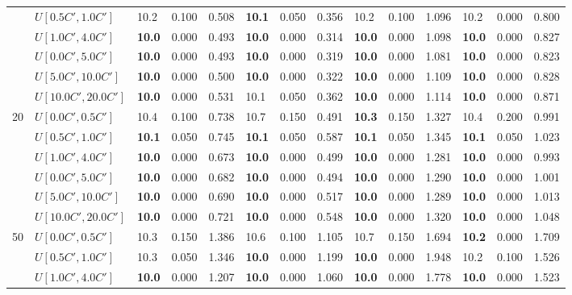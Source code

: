 \begin{table}[h]
{\begin{tabular}{|l|l||l|l|l||l|l|l||l|l|l||l|l|l|}
       & $U[0.5C',1.0C']$ & 10.2 & 0.100 & 0.508 & \textbf{10.1} & 0.050 & 0.356 & 10.2 & 0.100 & 1.096 & 10.2 & 0.000 & 0.800 \\
       & $U[1.0C',4.0C']$ & \textbf{10.0} & 0.000 & 0.493 & \textbf{10.0} & 0.000 & 0.314 & \textbf{10.0} & 0.000 & 1.098 & \textbf{10.0} & 0.000 & 0.827 \\
       & $U[0.0C',5.0C']$ & \textbf{10.0} & 0.000 & 0.493 & \textbf{10.0} & 0.000 & 0.319 & \textbf{10.0} & 0.000 & 1.081 & \textbf{10.0} & 0.000 & 0.823 \\
       & $U[5.0C',10.0C']$ & \textbf{10.0} & 0.000 & 0.500 & \textbf{10.0} & 0.000 & 0.322 & \textbf{10.0} & 0.000 & 1.109 & \textbf{10.0} & 0.000 & 0.828 \\
       & $U[10.0C',20.0C']$ & \textbf{10.0} & 0.000 & 0.531 & 10.1 & 0.050 & 0.362 & \textbf{10.0} & 0.000 & 1.114 & \textbf{10.0} & 0.000 & 0.871 \\
      \hline\hline
      \multirow{6}{*}{20} & $U[0.0C',0.5C']$ & 10.4 & 0.100 & 0.738 & 10.7 & 0.150 & 0.491 & \textbf{10.3} & 0.150 & 1.327 & 10.4 & 0.200 & 0.991 \\
       & $U[0.5C',1.0C']$ & \textbf{10.1} & 0.050 & 0.745 & \textbf{10.1} & 0.050 & 0.587 & \textbf{10.1} & 0.050 & 1.345 & \textbf{10.1} & 0.050 & 1.023 \\
       & $U[1.0C',4.0C']$ & \textbf{10.0} & 0.000 & 0.673 & \textbf{10.0} & 0.000 & 0.499 & \textbf{10.0} & 0.000 & 1.281 & \textbf{10.0} & 0.000 & 0.993 \\
       & $U[0.0C',5.0C']$ & \textbf{10.0} & 0.000 & 0.682 & \textbf{10.0} & 0.000 & 0.494 & \textbf{10.0} & 0.000 & 1.290 & \textbf{10.0} & 0.000 & 1.001 \\
       & $U[5.0C',10.0C']$ & \textbf{10.0} & 0.000 & 0.690 & \textbf{10.0} & 0.000 & 0.517 & \textbf{10.0} & 0.000 & 1.289 & \textbf{10.0} & 0.000 & 1.013 \\
       & $U[10.0C',20.0C']$ & \textbf{10.0} & 0.000 & 0.721 & \textbf{10.0} & 0.000 & 0.548 & \textbf{10.0} & 0.000 & 1.320 & \textbf{10.0} & 0.000 & 1.048 \\
      \hline\hline
      \multirow{6}{*}{50} & $U[0.0C',0.5C']$ & 10.3 & 0.150 & 1.386 & 10.6 & 0.100 & 1.105 & 10.7 & 0.150 & 1.694 & \textbf{10.2} & 0.000 & 1.709 \\
       & $U[0.5C',1.0C']$ & 10.3 & 0.050 & 1.346 & \textbf{10.0} & 0.000 & 1.199 & \textbf{10.0} & 0.000 & 1.948 & 10.2 & 0.100 & 1.526 \\
       & $U[1.0C',4.0C']$ & \textbf{10.0} & 0.000 & 1.207 & \textbf{10.0} & 0.000 & 1.060 & \textbf{10.0} & 0.000 & 1.778 & \textbf{10.0} & 0.000 & 1.523 \\

\end{tabular}}
\end{table}
